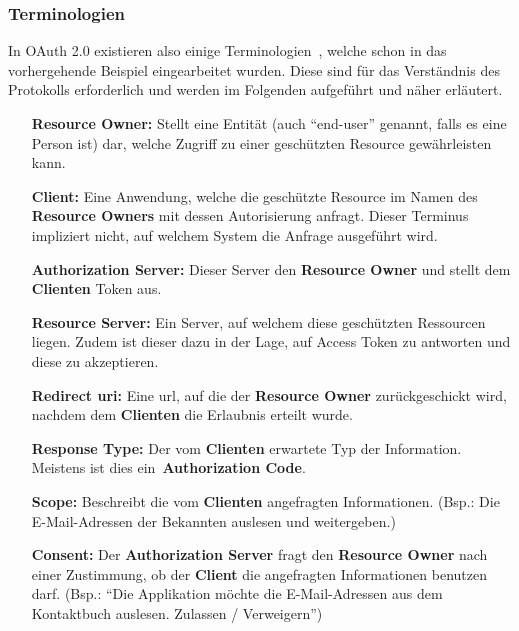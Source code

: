 	\subsubsection{Terminologien}\label{subsubsec:terminologien}
		In OAuth 2.0 existieren also einige Terminologien~\cite[Vgl.][]{rfc6749},
		welche schon in das vorhergehende Beispiel eingearbeitet wurden.
		Diese sind für das Verständnis des Protokolls erforderlich
		und werden im Folgenden aufgeführt und näher erläutert.
		\begin{itemize}
			\item[\textbf{Resource Owner:}] Stellt eine Entität
			(auch \enquote{end-user} genannt, falls es eine Person ist) dar,
			welche Zugriff zu einer geschützten Resource gewährleisten kann.

			\item[\textbf{Client:}] Eine Anwendung,
			welche die geschützte Resource im Namen
			des \textbf{Resource Owners} mit dessen Autorisierung anfragt.
			Dieser Terminus impliziert nicht,
			auf welchem System die Anfrage ausgeführt wird.

			\item[\textbf{Authorization Server:}] Dieser Server 
			den \textbf{Resource Owner} und stellt dem \textbf{Clienten} Token aus.

			\item[\textbf{Resource Server:}] Ein Server,
			auf welchem diese geschützten Ressourcen liegen.
			Zudem ist dieser dazu in der Lage,
			auf Access Token zu antworten und diese zu akzeptieren.

			\item[\textbf{Redirect \gls{uri}:}] Eine \gls{url},
			auf die der \textbf{Resource Owner} zurückgeschickt wird,
			nachdem dem \textbf{Clienten} die Erlaubnis erteilt wurde.

			\item[\textbf{Response Type:}] Der vom \textbf{Clienten} erwartete Typ der Information.
			Meistens ist dies ein~\textbf{Authorization Code}.

			\item[\textbf{Scope:}] Beschreibt die vom \textbf{Clienten} angefragten Informationen.
			(Bsp.: Die E-Mail-Adressen der Bekannten auslesen und weitergeben.)

			\item[\textbf{Consent:}] Der \textbf{Authorization Server} fragt
			den \textbf{Resource Owner} nach einer Zustimmung,
			ob der \textbf{Client} die angefragten Informationen benutzen darf.
			(Bsp.: \enquote{Die Applikation möchte die E-Mail-Adressen aus dem Kontaktbuch auslesen.
			Zulassen / Verweigern})


\end{itemize}
